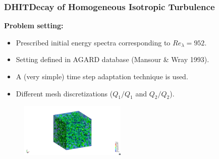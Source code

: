 \begin{frame}
  \frametitle{DHIT{\small Decay of Homogeneous Isotropic Turbulence}}
  \textbf{Problem setting:}
  \begin{itemize}
  \itemsep0cm
  \item Prescribed initial energy spectra corresponding to $Re_{\lambda}=952$.
  \item Setting defined in AGARD database (Mansour \& Wray 1993). 
  \item A (very simple) time step adaptation technique is used.
  \item Different mesh discretizations ($ Q_1/Q_1 $ and $ Q_2/Q_2 $).
  \end{itemize}
  \vspace{-0.1cm}
  \begin{figure}
      \centering	
      \includegraphics[clip=true,trim=19cm 2cm 19cm 3cm,width=0.45\textwidth]{Figures/iso_vorti_1.jpg}
  \end{figure}
\end{frame}
